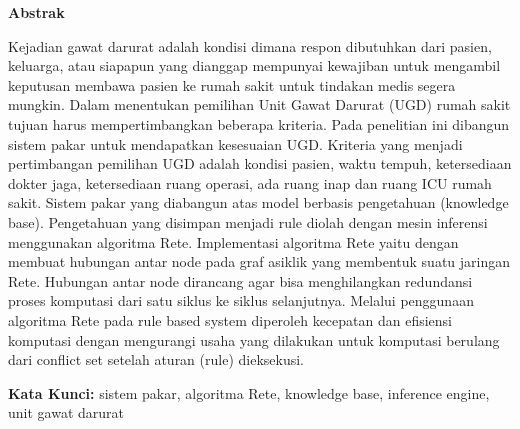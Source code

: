 {\centering
	\textbf{\large Abstrak}\\
	\vspace{0.5cm}
}

Kejadian gawat darurat adalah kondisi dimana respon dibutuhkan dari pasien, keluarga, atau siapapun yang dianggap mempunyai kewajiban untuk mengambil keputusan membawa pasien ke rumah sakit untuk tindakan medis segera mungkin. Dalam menentukan pemilihan Unit Gawat Darurat (UGD) rumah sakit tujuan harus mempertimbangkan beberapa kriteria. Pada penelitian ini dibangun sistem pakar untuk mendapatkan kesesuaian UGD. Kriteria yang menjadi pertimbangan pemilihan UGD adalah kondisi pasien, waktu tempuh, ketersediaan dokter jaga, ketersediaan ruang operasi, ada ruang inap dan ruang ICU rumah sakit. Sistem pakar yang diabangun atas model berbasis pengetahuan (knowledge base). Pengetahuan yang disimpan menjadi rule diolah dengan mesin inferensi menggunakan algoritma Rete. Implementasi algoritma Rete yaitu dengan membuat hubungan antar node pada graf asiklik yang membentuk suatu jaringan Rete. Hubungan antar node dirancang agar bisa menghilangkan redundansi proses komputasi dari satu siklus ke siklus selanjutnya. Melalui penggunaan algoritma Rete pada rule based system diperoleh kecepatan dan efisiensi komputasi dengan mengurangi usaha yang dilakukan untuk komputasi berulang dari conflict set setelah aturan (rule) dieksekusi.
  
\vspace{0.5 cm}
\begin{flushleft}
{\textbf{Kata Kunci:} sistem pakar, algoritma Rete, knowledge base, inference engine, unit gawat darurat}
\end{flushleft}